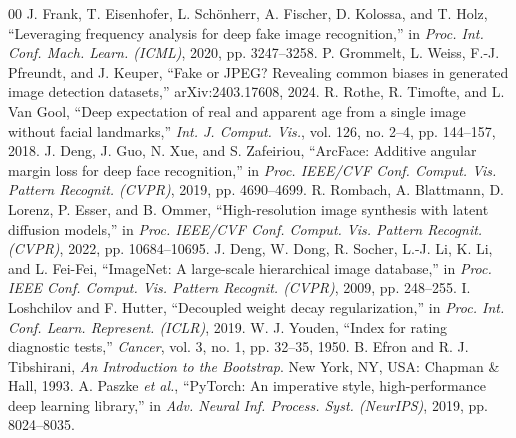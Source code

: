 \documentclass[conference]{IEEEtran}
\begin{document}
\begin{thebibliography}{00}
 J. Frank, T. Eisenhofer, L. Sch\"onherr, A. Fischer, D. Kolossa, and T. Holz, ``Leveraging frequency analysis for deep fake image recognition,'' in \textit{Proc. Int. Conf. Mach. Learn. (ICML)}, 2020, pp. 3247--3258.
 P. Grommelt, L. Weiss, F.-J. Pfreundt, and J. Keuper, ``Fake or JPEG? Revealing common biases in generated image detection datasets,'' arXiv:2403.17608, 2024.
 R. Rothe, R. Timofte, and L. Van Gool, ``Deep expectation of real and apparent age from a single image without facial landmarks,'' \textit{Int. J. Comput. Vis.}, vol. 126, no. 2--4, pp. 144--157, 2018.
 J. Deng, J. Guo, N. Xue, and S. Zafeiriou, ``ArcFace: Additive angular margin loss for deep face recognition,'' in \textit{Proc. IEEE/CVF Conf. Comput. Vis. Pattern Recognit. (CVPR)}, 2019, pp. 4690--4699.
 R. Rombach, A. Blattmann, D. Lorenz, P. Esser, and B. Ommer, ``High-resolution image synthesis with latent diffusion models,'' in \textit{Proc. IEEE/CVF Conf. Comput. Vis. Pattern Recognit. (CVPR)}, 2022, pp. 10684--10695.
 J. Deng, W. Dong, R. Socher, L.-J. Li, K. Li, and L. Fei-Fei, ``ImageNet: A large-scale hierarchical image database,'' in \textit{Proc. IEEE Conf. Comput. Vis. Pattern Recognit. (CVPR)}, 2009, pp. 248--255.
 I. Loshchilov and F. Hutter, ``Decoupled weight decay regularization,'' in \textit{Proc. Int. Conf. Learn. Represent. (ICLR)}, 2019.
 W. J. Youden, ``Index for rating diagnostic tests,'' \textit{Cancer}, vol. 3, no. 1, pp. 32--35, 1950.
 B. Efron and R. J. Tibshirani, \textit{An Introduction to the Bootstrap}. New York, NY, USA: Chapman \& Hall, 1993.
 A. Paszke \textit{et al.}, ``PyTorch: An imperative style, high-performance deep learning library,'' in \textit{Adv. Neural Inf. Process. Syst. (NeurIPS)}, 2019, pp. 8024--8035.
\end{thebibliography}
\end{document}
